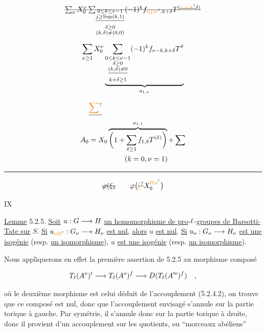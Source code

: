 \[
\deleted{\sum_{\nu}X_0^\nu\sum_{\substack{0\leq k\leq\nu-1\\\deleted{j\geq\mathrm{Sup}(k,1)}\\\delta\geq0\\(k,\delta)\ne(0,0)}}(-1)^k f_{\unsure{i|j|\nu},k+\delta}T^{(\deleted{\unsure{j-k}}\delta)}}
\]

\[
\sum_{\nu\geq1}X_0^\nu
\underbrace{\sum_{\substack{0\leq k\leq\nu-1\\\delta\geq0\\\deleted{(k,\delta)\ne0}\\k+\delta\geq1}}(-1)^k f_{\nu-k,k+\delta}T^\delta}_{a_{1,\nu}}
\]

\[
\begin{aligned}
&\deleted{\unsure{\sum}}\\
A_0&=X_0\overbrace{\biggl(1+\sum_{\delta\geq1}f_{1,\delta}T^{(\delta)}\biggr)}^{a_{1,1}}+\sum\\
&\hspace{5em}(k=0,\nu=1)
\end{aligned}
\]

\noindent\rule{\linewidth}{0.3pt}

\[
\deleted{\varphi(\xi_1}\qquad\varphi\bigl(\deleted{\unsure{(}}X_0^{\unsure{0|o}}\bigr)
\]


\hfill IX

\uline{Lemme} 5.2.5. \uline{Soit} $u:G \longrightarrow H$ \uline{un homomorphisme de pro}-$\ell$-\uline{groupes de Barsotti-Tate sur} $S$. \uline{Si} $u_{\unsure{o|0}}:G_o \handwritten{\longrightarrow} H_o$ \uline{est nul}, \uline{alors} $u$ \uline{est nul}. \uline{Si} $u_o:G_o \longrightarrow H_o$ \uline{est une isogénie} (resp. \uline{un isomorphisme}), $u$ \uline{est une isogénie} (resp. \uline{un isomorphisme}).

Nous appliquerons en effet la première assertion de 5.2.5 au morphisme composé

\[
T_{\ell}(A^o)^t \longrightarrow T_{\ell}(A^o)^f \longrightarrow D(T_{\ell}(A^{\prime o})^f)\quad ,
\]

où le deuxième morphisme est celui déduit de l'accouplement (5.2.4.2), on trouve que ce composé est nul, donc que l'accouplement envisagé s'annule sur la partie torique à gauche. Par symétrie, il s'annule donc sur la partie torique à droite, donc il provient d'un accouplement sur les quotients, ou ``morceaux abéliens''

